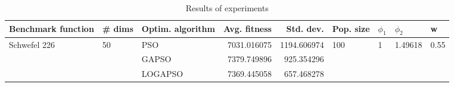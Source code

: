 \begin{table}
\centering
\caption{Results of experiments}
\begin{tabular}{lllrrllll}
\toprule
           Benchmark function &             \# dims & Optim. algorithm &  Avg. fitness &   Std. dev. &            Pop. size &         $\phi_{1}$ &               $\phi_{2}$ &                     w \\
\midrule
\multirow{3}{*}{Schwefel 226} & \multirow{3}{*}{50} &              PSO &   7031.016075 & 1194.606974 & \multirow{3}{*}{100} & \multirow{3}{*}{1} & \multirow{3}{*}{1.49618} & \multirow{3}{*}{0.55} \\
                              &                     &            GAPSO &   7379.749896 &  925.354296 &                      &                    &                          &                       \\
                              &                     &          LOGAPSO &   7369.445058 &  657.468278 &                      &                    &                          &                       \\
\bottomrule
\end{tabular}
\end{table}
